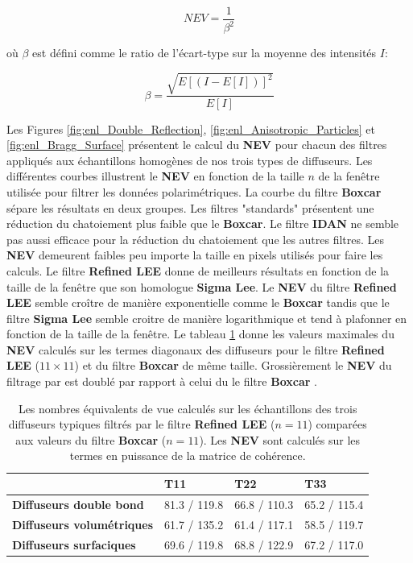 \begin{equation}
    NEV = \frac{1}{  \beta^2}
\end{equation}

où $\beta$ est défini comme le ratio de l'écart-type sur la moyenne des intensités $I$:

\begin{equation}
\beta=\frac{\sqrt{E\left[(I-E\left[I\right])\right]^2}}{E\left[I\right]}
\end{equation}

Les Figures \ref{fig:enl_Double_Reflection}, \ref{fig:enl_Anisotropic_Particles} et \ref{fig:enl_Bragg_Surface} présentent le calcul du \textbf{NEV} pour chacun des filtres appliqués aux échantillons homogènes de nos trois types de diffuseurs. Les différentes courbes illustrent le \textbf{NEV} en fonction de la taille $n$ de la fenêtre utilisée pour filtrer les données polarimétriques. La courbe du filtre \textbf{Boxcar} sépare les résultats en deux groupes.  Les filtres "standards" présentent une réduction du chatoiement plus faible que le \textbf{Boxcar}.   Le filtre \textbf{IDAN} ne semble pas aussi efficace pour la réduction du chatoiement que les autres filtres. Les \textbf{NEV} demeurent faibles peu importe la taille en pixels utilisés pour faire les calculs.  Le filtre \textbf{Refined LEE} donne de meilleurs résultats en fonction de la taille de la fenêtre que son homologue \textbf{Sigma Lee}. Le \textbf{NEV} du filtre \textbf{Refined LEE} semble croître de manière exponentielle comme le \textbf{Boxcar} tandis que le filtre \textbf{Sigma Lee} semble croitre de manière logarithmique et tend à plafonner en fonction de la taille de la fenêtre.  Le tableau \ref{tab:refine_lee_nev} donne les valeurs maximales du \textbf{NEV} calculés sur les termes diagonaux des diffuseurs pour le filtre \textbf{Refined LEE} ($11 \times 11$) et du filtre \textbf{Boxcar} de même taille. Grossièrement le \textbf{NEV} du filtrage par \acrconvnet est doublé par rapport à celui du le filtre \textbf{Boxcar} .

\begin{table}[!htbp]
\centering
\begin{tabular}{|l|l|l|l|}
\hline
                     & \textbf{T11} & \textbf{T22} & \textbf{T33}                       \\ \hline
\textbf{Diffuseurs double bond} & 81.3 / 119.8      & 66.8 / 110.3        & 65.2 / 115.4           \\ \hline 
\textbf{Diffuseurs volumétriques}      & 61.7  / 135.2         & 61.4  / 117.1       & 58.5 / 119.7       \\ \hline
\textbf{Diffuseurs surfaciques}     & 69.6 / 119.8        & 68.8 / 122.9        & 67.2 / 117.0         \\ \hline  
\end{tabular}
\caption{\small{Les nombres équivalents de vue calculés sur les échantillons des trois diffuseurs typiques filtrés par le filtre \textbf{Refined LEE} ($n=11$) comparées aux valeurs du filtre \textbf{Boxcar} ($n=11$).  Les \textbf{NEV} sont calculés sur les termes en puissance de la matrice de cohérence. }
}
\label{tab:refine_lee_nev}
\end{table}

